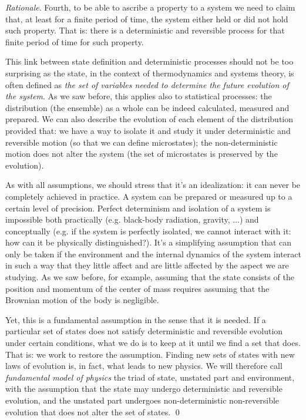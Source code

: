 \documentclass[aps,pra,10pt,twocolumn,floatfix,nofootinbib]{revtex4-1}
\theoremstyle{definition}
\newenvironment{rationale}{\emph{Rationale}.}{\qed}
\begin{document}
\begin{rationale}
Fourth, to be able to ascribe a property to a system we need to claim that, at least for a finite period of time, the system either held or did not hold such property. That is: there is a deterministic and reversible process for that finite period of time for such property.

This link between state definition and deterministic processes should not be too surprising as the state, in the context of thermodynamics and systems theory, is often defined as \emph{the set of variables needed to determine the future evolution of the system}. As we saw before, this applies also to statistical processes: the distribution (the ensemble) as a whole can be indeed calculated, measured and prepared. We can also describe the evolution of each element of the distribution provided that: we have a way to isolate it and study it under deterministic and reversible motion (so that we can define microstates); the non-deterministic motion does not alter the system (the set of microstates is preserved by the evolution).

As with all assumptions, we should stress that it's an idealization: it can never be completely achieved in practice. A system can be prepared or measured up to a certain level of precision. Perfect determinism and isolation of a system is impossible both practically (e.g. black-body radiation, gravity, ...) and conceptually (e.g. if the system is perfectly isolated, we cannot interact with it: how can it be physically distinguished?). It's a simplifying assumption that can only be taken if the environment and the internal dynamics of the system interact in such a way that they little affect and are little affected by the aspect we are studying. As we saw before, for example, assuming that the state consists of the position and momentum of the center of mass requires assuming that the Brownian motion of the body is negligible.

Yet, this is a fundamental assumption in the sense that it is needed. If a particular set of states does not satisfy deterministic and reversible evolution under certain conditions, what we do is to keep at it until we find a set that does. That is: we work to restore the assumption. Finding new sets of states with new laws of evolution is, in fact, what leads to new physics. We will therefore call \emph{fundamental model of physics} the triad of state, unstated part and environment, with the assumption that the state may undergo deterministic and reversible evolution, and the unstated part undergoes non-deterministic non-reversible evolution that does not alter the set of states.
\end{rationale}
\end{document}
